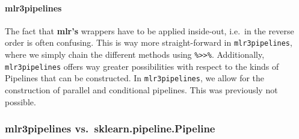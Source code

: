 \documentclass[]{article}
\newenvironment{Shaded}{\begin{snugshade}}{\end{snugshade}}
\newcommand{\CommentTok}[1]{\textcolor[rgb]{0.56,0.35,0.01}{\textit{#1}}}
\newcommand{\DataTypeTok}[1]{\textcolor[rgb]{0.13,0.29,0.53}{#1}}
\newcommand{\KeywordTok}[1]{\textcolor[rgb]{0.13,0.29,0.53}{\textbf{#1}}}
\newcommand{\NormalTok}[1]{#1}
\newcommand{\OperatorTok}[1]{\textcolor[rgb]{0.81,0.36,0.00}{\textbf{#1}}}
\newcommand{\StringTok}[1]{\textcolor[rgb]{0.31,0.60,0.02}{#1}}
\let\oldparagraph\paragraph
\renewcommand{\paragraph}[1]{\oldparagraph{#1}\mbox{}}
\renewenvironment{Shaded} {\begin{snugshade}\small} {\end{snugshade}}
\begin{document}
\hypertarget{mlr3pipelines}{%
\paragraph{mlr3pipelines}\label{mlr3pipelines}}

\begin{Shaded}
\end{Shaded}

The fact that \textbf{mlr's} wrappers have to be applied inside-out, i.e.~in the reverse order is often confusing.
This is way more straight-forward in \texttt{mlr3pipelines}, where we simply chain the different methods using \texttt{\%\textgreater{}\textgreater{}\%}.
Additionally, \texttt{mlr3pipelines} offers way greater possibilities with respect to the kinds of Pipelines that can be constructed.
In \texttt{mlr3pipelines}, we allow for the construction of parallel and conditional pipelines.
This was previously not possible.

\hypertarget{mlr3pipelines-vs.sklearn.pipeline.pipeline}{%
\subsubsection{mlr3pipelines vs.~sklearn.pipeline.Pipeline}\label{mlr3pipelines-vs.sklearn.pipeline.pipeline}}
\end{document}
